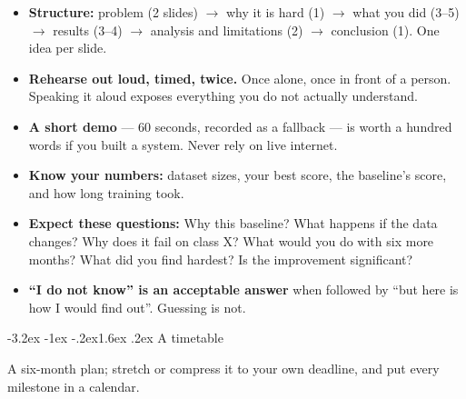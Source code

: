 \documentclass[11pt,a4paper]{article}
\makeatletter
\renewcommand\section{\@startsection{section}{1}{\z@}%
  {-3.2ex \@plus -1ex \@minus -.2ex}{1.6ex \@plus.2ex}%
  {\normalfont\Large\bfseries\color{brand}}}
\makeatother
\begin{document}
\begin{itemize}
  \item \textbf{Structure:} problem (2 slides) $\rightarrow$ why it is hard
        (1) $\rightarrow$ what you did (3--5) $\rightarrow$ results (3--4)
        $\rightarrow$ analysis and limitations (2) $\rightarrow$ conclusion
        (1). One idea per slide.
  \item \textbf{Rehearse out loud, timed, twice.} Once alone, once in front of
        a person. Speaking it aloud exposes everything you do not actually
        understand.
  \item \textbf{A short demo} --- 60 seconds, recorded as a fallback --- is
        worth a hundred words if you built a system. Never rely on live
        internet.
  \item \textbf{Know your numbers:} dataset sizes, your best score, the
        baseline's score, and how long training took.
  \item \textbf{Expect these questions:} Why this baseline? What happens if
        the data changes? Why does it fail on class X? What would you do with
        six more months? What did you find hardest? Is the improvement
        significant?
  \item \textbf{``I do not know'' is an acceptable answer} when followed by
        ``but here is how I would find out''. Guessing is not.
\end{itemize}

\section{A timetable}

A six-month plan; stretch or compress it to your own deadline, and put every
milestone in a calendar.
\end{document}
